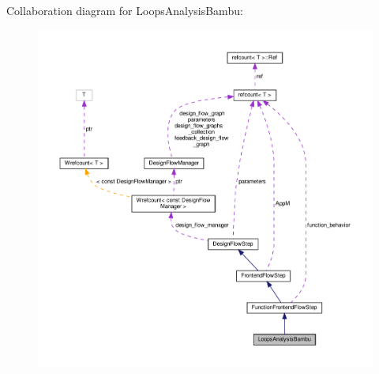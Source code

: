 Collaboration diagram for Loops\+Analysis\+Bambu\+:
\nopagebreak
\begin{figure}[H]
\begin{center}
\leavevmode
\includegraphics[width=350pt]{db/d09/classLoopsAnalysisBambu__coll__graph}
\end{center}
\end{figure}
